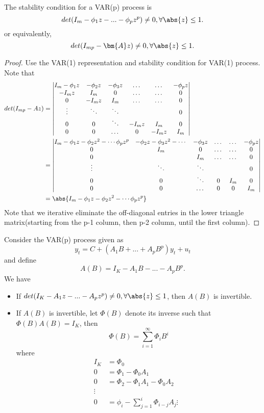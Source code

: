 \begin{lemma}
The stability condition for a VAR(p) process is
$$det(I_m - \phi_1z - ... - \phi_p z^p) \neq 0, \forall \abs{z} \leq 1.$$
or equivalently, $$det(I_{mp} - \bm{A}z)\neq 0, \forall \abs{z} \leq 1.$$
\end{lemma}
\begin{proof}
Use the VAR(1) representation and stability condition for VAR(1) process. Note that
\begin{align*}
det(I_{mp} - Az) &= \begin{vmatrix}
I_m-\phi_1 z & -\phi_2 z & -\phi_3 z& \dots & \dots & -\phi_p z\\ 
-I_m z & I_m & 0 & \dots & \dots & 0 \\ 
0 & -I_m z& I_m & \dots & \dots & 0 \\ 
\vdots & \ddots & \ddots &  &  & 0\\ 
0 & 0 & \ddots & -I_m z& I_m & 0\\ 
0 & 0 &  \dots & 0 & -I_m z & I_m
\end{vmatrix} \\
&=\begin{vmatrix}
I_m-\phi_1 z -\phi_2 z^2 - \cdots \phi_p z^p & -\phi_2 z - \phi_3z^2 -\cdots & -\phi_3 z& \dots & \dots & -\phi_p z\\ 
0 & I_m & 0 & \dots & \dots & 0 \\ 
0 & & I_m & \dots & \dots & 0 \\ 
\vdots & \ddots & \ddots &  &  & 0\\ 
0 & 0 & \ddots & 0& I_m & 0\\ 
0 & 0 &  \dots & 0 & 0 & I_m
\end{vmatrix} \\
&= \abs{I_m-\phi_1 z -\phi_2 z^2 - \cdots \phi_p z^p} 
\end{align*}
Note that we iterative eliminate the off-diagonal entries in the lower triangle matrix(starting from the p-1 column, then p-2 column, until the first column).
\end{proof}


\begin{lemma}\cite[23]{lutkepohl2005new}
Consider the VAR(p) process given as
$$y_t = C + (A_1B + ... + A_pB^p)y_t + u_t$$
and define 
$$A(B) = I_K - A_1B - ... - A_pB^p.$$
We have
\begin{itemize}
\item If $det(I_K - A_1z - ... - A_p z^p) \neq 0, \forall \abs{z} \leq 1 $, then $A(B)$ is invertible.
\item If $A(B)$ is invertible, let $\Phi(B)$ denote its inverse such that $\Phi(B)A(B) = I_K$, then 
$$\Phi(B) = \sum_{i=1}^\infty \Phi_i B^i$$
where
\begin{align*}
I_K &= \Phi_0\\
0 &=\Phi_1 - \Phi_0A_1\\
0 &=\Phi_2 - \Phi_1A_1 - \Phi_0A_2\\
\vdots & \\
0 &=\phi_i - \sum_{j=1}^i \Phi_{i-j}A_j
\vdots &
\end{align*}
\end{itemize}
\end{lemma}

